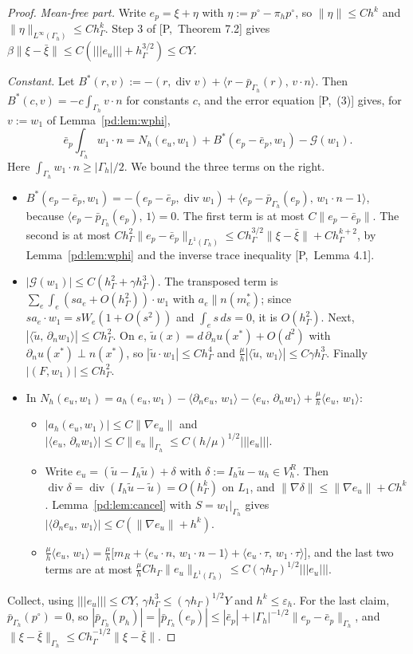 \documentclass[11pt,reqno]{amsart}
\theoremstyle{plain}
\theoremstyle{definition}
\newcommand{\hG}{h_\Gamma}
\newcommand{\Gh}{\Gamma_h}
\newcommand{\VR}{V_h^R}
\newcommand{\dn}{\partial_n}
\newcommand{\ut}{\tilde u}
\newcommand{\pbar}{\bar p}
\newcommand{\ip}[2]{\langle #1,\, #2\rangle}
\newcommand{\tnorm}[1]{|\!|\!|#1|\!|\!|}
\newcommand{\norm}[1]{\lVert #1\rVert}
\newcommand{\eps}{\varepsilon_h}
\renewcommand{\div}{\operatorname{div}}
\newcommand{\Gc}{\mathcal G}
\newcommand{\Pref}[1]{\textup{[P,~#1]}}
\newcommand{\Lay}{L_1}
\begin{document}
\begin{proof}
\emph{Mean-free part.} Write $e_p=\xi+\eta$ with $\eta:=p^\circ-\pi_hp^\circ$, so $\norm\eta\le Ch^k$ and $\norm\eta_{L^\infty(\Gh)}\le C\hG^k$. Step 3 of \Pref{Theorem 7.2} gives $\beta\norm{\xi-\bar\xi}\le C(\tnorm{e_u}+\hG^{3/2})\le CY$.

\emph{Constant.} Let $B^\ast(r,v):=-(r,\div v)+\ip{r-\pbar_{\Gh}(r)}{v\cdot n}$. Then $B^\ast(c,v)=-c\int_{\Gh}v\cdot n$ for constants $c$, and the error equation \Pref{(3)} gives, for $v:=w_1$ of Lemma~\ref{pd:lem:wphi},
\begin{equation}\label{pd:eq:const}
\bar e_p\int_{\Gh}w_1\cdot n=N_h(e_u,w_1)+B^\ast(e_p-\bar e_p,w_1)-\Gc(w_1).
\end{equation}
Here $\int_{\Gh}w_1\cdot n\ge|\Gh|/2$. We bound the three terms on the right.
\begin{itemize}
\item $B^\ast(e_p-\bar e_p,w_1)=-(e_p-\bar e_p,\div w_1)+\ip{e_p-\pbar_{\Gh}(e_p)}{w_1\cdot n-1}$, because $\ip{e_p-\pbar_{\Gh}(e_p)}1=0$. The first term is at most $C\norm{e_p-\bar e_p}$. The second is at most $C\hG^2\norm{e_p-\bar e_p}_{L^1(\Gh)}\le C\hG^{3/2}\norm{\xi-\bar\xi}+C\hG^{k+2}$, by Lemma~\ref{pd:lem:wphi} and the inverse trace inequality \Pref{Lemma 4.1}.
\item $|\Gc(w_1)|\le C(\hG^2+\gamma\hG^3)$. The transposed term is $\sum_e\int_e(sa_e+O(\hG^2))\cdot w_1$ with $a_e\parallel n(m_e^\ast)$; since $sa_e\cdot w_1=sW_e(1+O(s^2))$ and $\int_es\,ds=0$, it is $O(\hG^2)$. Next, $|\ip\ut{\dn w_1}|\le C\hG^2$. On $e$, $\ut(x)=d\,\dn u(x^\ast)+O(d^2)$ with $\dn u(x^\ast)\perp n(x^\ast)$, so $|\ut\cdot w_1|\le C\hG^4$ and $\frac\mu h|\ip\ut{w_1}|\le C\gamma\hG^3$. Finally $|(F,w_1)|\le C\hG^2$.
\item In $N_h(e_u,w_1)=a_h(e_u,w_1)-\ip{\dn e_u}{w_1}-\ip{e_u}{\dn w_1}+\frac\mu h\ip{e_u}{w_1}$:
\begin{itemize}
\item $|a_h(e_u,w_1)|\le C\norm{\nabla e_u}$ and $|\ip{e_u}{\dn w_1}|\le C\norm{e_u}_{\Gh}\le C(h/\mu)^{1/2}\tnorm{e_u}$.
\item Write $e_u=(\ut-I_h\ut)+\delta$ with $\delta:=I_h\ut-u_h\in\VR$. Then $\div\delta=\div(I_h\ut-\ut)=O(\hG^k)$ on $\Lay$, and $\norm{\nabla\delta}\le\norm{\nabla e_u}+Ch^k$. Lemma~\ref{pd:lem:cancel} with $S=w_1|_{\Gh}$ gives $|\ip{\dn e_u}{w_1}|\le C(\norm{\nabla e_u}+h^k)$.
\item $\frac\mu h\ip{e_u}{w_1}=\frac\mu h\bigl[m_R+\ip{e_u\cdot n}{w_1\cdot n-1}+\ip{e_u\cdot\tau}{w_1\cdot\tau}\bigr]$, and the last two terms are at most $\frac\mu hC\hG\norm{e_u}_{L^1(\Gh)}\le C(\gamma\hG)^{1/2}\tnorm{e_u}$.
\end{itemize}
\end{itemize}
Collect, using $\tnorm{e_u}\le CY$, $\gamma\hG^3\le(\gamma\hG)^{1/2}Y$ and $h^k\le\eps$. For the last claim, $\pbar_{\Gh}(p^\circ)=0$, so $|\pbar_{\Gh}(p_h)|=|\pbar_{\Gh}(e_p)|\le|\bar e_p|+|\Gh|^{-1/2}\norm{e_p-\bar e_p}_{\Gh}$, and $\norm{\xi-\bar\xi}_{\Gh}\le C\hG^{-1/2}\norm{\xi-\bar\xi}$.
\end{proof}
\end{document}
